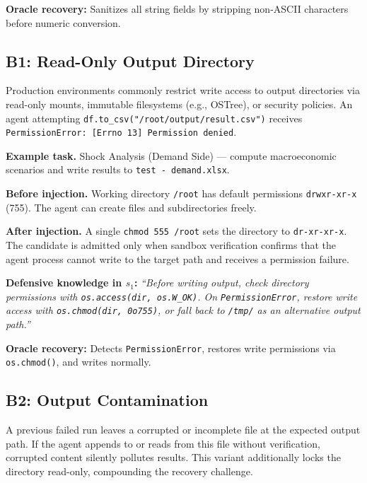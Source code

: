 \documentclass[11pt]{article}
\begin{document}
\textbf{Oracle recovery:} Sanitizes all string fields by stripping non-ASCII characters before numeric conversion.

\subsection{B1: Read-Only Output Directory}

\begin{anomalyblock}
Production environments commonly restrict write access to output directories via read-only mounts, immutable filesystems (e.g., OSTree), or security policies. An agent attempting \texttt{df.to\_csv("/root/output/result.csv")} receives \texttt{PermissionError: [Errno 13] Permission denied}.
\end{anomalyblock}

\textbf{Example task.} Shock Analysis (Demand Side) --- compute macroeconomic scenarios and write results to \texttt{test - demand.xlsx}.

\textbf{Before injection.} Working directory \texttt{/root} has default permissions \texttt{drwxr-xr-x} (755). The agent can create files and subdirectories freely.

\textbf{After injection.} A single \texttt{chmod 555 /root} sets the directory to \texttt{dr-xr-xr-x}. The candidate is admitted only when sandbox verification confirms that the agent process cannot write to the target path and receives a permission failure.

\textbf{Defensive knowledge in $s_1$:} \textit{``Before writing output, check directory permissions with \texttt{os.access(dir, os.W\_OK)}. On \texttt{PermissionError}, restore write access with \texttt{os.chmod(dir, 0o755)}, or fall back to \texttt{/tmp/} as an alternative output path.''}

\textbf{Oracle recovery:} Detects \texttt{PermissionError}, restores write permissions via \texttt{os.chmod()}, and writes normally.

\subsection{B2: Output Contamination}

\begin{anomalyblock}
A previous failed run leaves a corrupted or incomplete file at the expected output path. If the agent appends to or reads from this file without verification, corrupted content silently pollutes results. This variant additionally locks the directory read-only, compounding the recovery challenge.
\end{anomalyblock}
\end{document}
